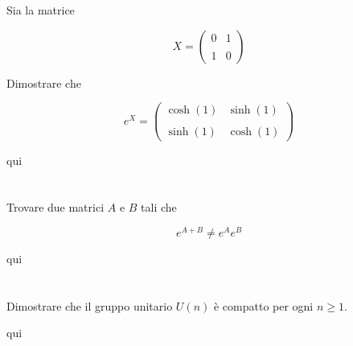 \tocless\section{}\label{es3-3}

\begin{tcolorbox}
	Sia la matrice
	
	\begin{equation}
		X = \begin{pmatrix} 0 & 1 \\\\ 1 & 0 \end{pmatrix}
	\end{equation}

	Dimostrare che
	
	\begin{equation}
		e^{X} = \begin{pmatrix} \cosh(1) & \sinh(1) \\\\ \sinh(1) & \cosh(1) \end{pmatrix}
	\end{equation}
\end{tcolorbox}

qui

\tocless\section{}\label{es3-4}

\begin{tcolorbox}
	Trovare due matrici $ A $ e $ B $ tali che
	
	\begin{equation}
		e^{A+B} \neq e^{A} e^{B}
	\end{equation}
\end{tcolorbox}

qui

\tocless\section{}\label{es3-5}

\begin{tcolorbox}
	Dimostrare che il gruppo unitario $ U(n) $ è compatto per ogni $ n \geqslant 1 $.
\end{tcolorbox}

qui

\tocless\section{}\label{es3-6}

